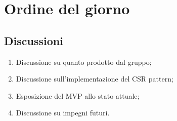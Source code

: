 \section{Ordine del giorno} \label{sec:agenda}
\subsection{Discussioni} \label{subsec:discussione}
\begin{enumerate}
    \item Discussione su quanto prodotto dal gruppo;
    \item Discussione sull'implementazione del CSR pattern;
    \item Esposizione del MVP allo stato attuale;
    \item Discussione su impegni futuri.
\end{enumerate}

